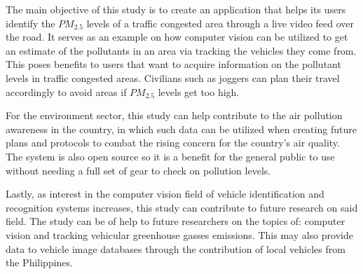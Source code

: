 The main objective of this study is to create an application that helps its users identify the $PM_{2.5}$ levels of a traffic congested area through a live video feed over the road. It serves as an example on how computer vision can be utilized to get an estimate of the pollutants in an area via tracking the vehicles they come from. This poses benefits to users that want to acquire information on the pollutant levels in traffic congested areas. Civilians such as joggers can plan their travel accordingly to avoid areas if $PM_{2.5}$ levels get too high.

For the environment sector, this study can help contribute to the air pollution awareness in the country, in which such data can be utilized when creating future plans and protocols to combat the rising concern for the country’s air quality. The system is also open source so it is a benefit for the general public to use without needing a full set of gear to check on pollution levels.

Lastly, as interest in the computer vision field of vehicle identification and recognition systems increases, this study can contribute to future research on said field. The study can be of help to future researchers on the topics of: computer vision and tracking vehicular greenhouse gasses emissions. This may also provide data to vehicle image databases through the contribution of local vehicles from the Philippines.




\begin{comment}
If applicable, describe possible commercialization and/or innovation in your research.
\end{comment}


